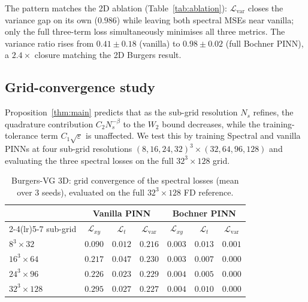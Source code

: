 \documentclass[review,12pt]{elsarticle}
\begin{document}
The pattern matches the 2D ablation
(Table~\ref{tab:ablation}): \(\mathcal{L}_{\mathrm{var}}\) closes the
variance gap on its own (\(0.986\)) while leaving both spectral MSEs
near vanilla; only the full three-term loss simultaneously minimises
all three metrics. The variance ratio rises from
\(0.41 \pm 0.18\) (vanilla) to
\(0.98 \pm 0.02\) (full Bochner PINN), a \(2.4\times\) closure
matching the 2D Burgers result.

\subsection{Grid-convergence study}

Proposition~\ref{thm:main} predicts that as the sub-grid resolution
\(N_s\) refines, the quadrature contribution \(C_2 N_s^{-\beta}\) to
the \(W_2\) bound decreases, while the training-tolerance term
\(C_1\sqrt\varepsilon\) is unaffected. We test this by training
Spectral and vanilla PINNs at four sub-grid resolutions
\((8, 16, 24, 32)^3 \times (32, 64, 96, 128)\) and evaluating the
three spectral losses on the full \(32^3 \times 128\) grid.

\begin{table}[h]
\centering
\caption{Burgers-VG 3D: grid convergence of the spectral losses (mean
over 3 seeds), evaluated on the full \(32^3 \times 128\) FD reference.}
\label{tab:grid-conv-3d}
\begin{tabular}{l c c c c c c}
\toprule
    & \multicolumn{3}{c}{\textbf{Vanilla PINN}}
    & \multicolumn{3}{c}{\textbf{Bochner PINN}} \\
\cmidrule(lr){2-4}\cmidrule(lr){5-7}
sub-grid & \(\mathcal{L}_{xy}\) & \(\mathcal{L}_{t}\)
     & \(\mathcal{L}_{\mathrm{var}}\)
     & \(\mathcal{L}_{xy}\) & \(\mathcal{L}_{t}\)
     & \(\mathcal{L}_{\mathrm{var}}\) \\
\midrule
\(8^3 \times 32\)   & \(0.090\) & \(0.012\) & \(0.216\) &
            \(0.003\) & \(0.013\) & \(0.001\) \\
\(16^3 \times 64\)  & \(0.217\) & \(0.047\) & \(0.230\) &
            \(0.003\) & \(0.007\) & \(0.000\) \\
\(24^3 \times 96\)  & \(0.226\) & \(0.023\) & \(0.229\) &
            \(0.004\) & \(0.005\) & \(0.000\) \\
\(32^3 \times 128\)  & \(0.295\) & \(0.027\) & \(0.227\) &
            \(0.004\) & \(0.010\) & \(0.000\) \\
\bottomrule
\end{tabular}
\end{table}
\end{document}
